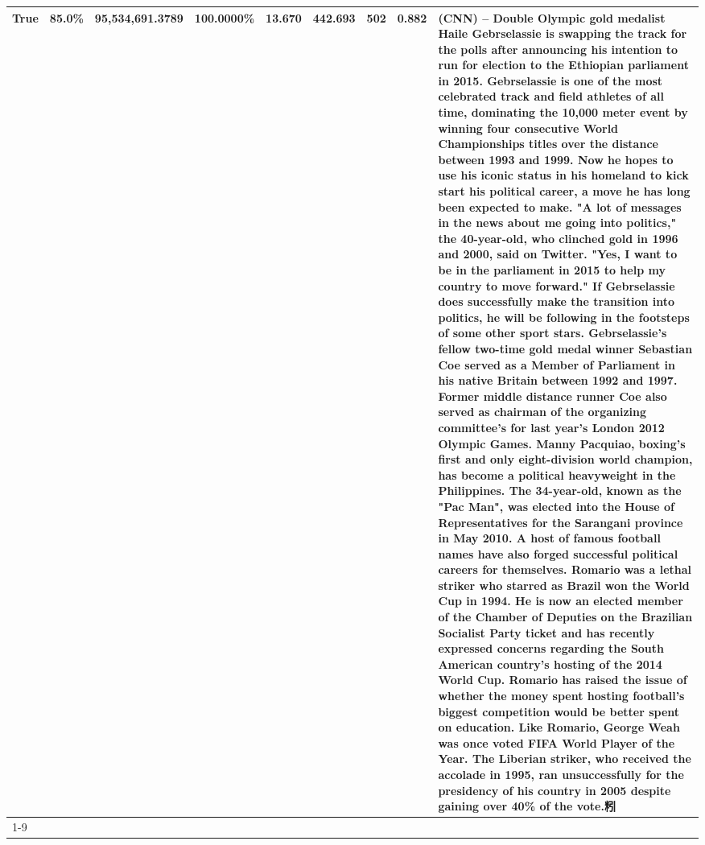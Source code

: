 \begin{table}[H]
{\begin{tabular}{lllrlllll}
True & 85.0\% & 95,534,691.3789 & \bfseries \color{red} 100.0000\% & 13.670 & 442.693 & 502 & 0.882 & (CNN) -- Double Olympic gold medalist Haile Gebrselassie is swapping the track for the polls after announcing his intention to run for election to the Ethiopian parliament in 2015. Gebrselassie is one of the most celebrated track and field athletes of all time, dominating the 10,000 meter event by winning four consecutive World Championships titles over the distance between 1993 and 1999. Now he hopes to use his iconic status in his homeland to kick start his political career, a move he has long been expected to make. "A lot of messages in the news about me going into politics," the 40-year-old, who clinched gold in 1996 and 2000, said on Twitter. "Yes, I want to be in the parliament in 2015 to help my country to move forward." If Gebrselassie does successfully make the transition into politics, he will be following in the footsteps of some other sport stars. Gebrselassie's fellow two-time gold medal winner Sebastian Coe served as a Member of Parliament in his native Britain between 1992 and 1997. Former middle distance runner Coe also served as chairman of the organizing committee's for last year's London 2012 Olympic Games. Manny Pacquiao, boxing's first and only eight-division world champion, has become a political heavyweight in the Philippines. The 34-year-old, known as the "Pac Man", was elected into the House of Representatives for the Sarangani province in May 2010. A host of famous football names have also forged successful political careers for themselves. Romario was a lethal striker who starred as Brazil won the World Cup in 1994. He is now an elected member of the Chamber of Deputies on the Brazilian Socialist Party ticket and has recently expressed concerns regarding the South American country's hosting of the 2014 World Cup. Romario has raised the issue of whether the money spent hosting football's biggest competition would be better spent on education. Like Romario, George Weah was once voted FIFA World Player of the Year. The Liberian striker, who received the accolade in 1995, ran unsuccessfully for the presidency of his country in 2005 despite gaining over 40\% of the vote.粌 \\
\cline{1-9}

\end{tabular}}
\end{table}
